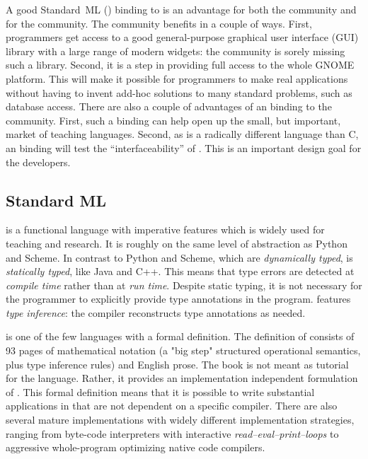 \documentclass[finalversion]{usetex-v1}
\begin{document}
%
A good Standard~ML (\sml) binding to \gtk is an advantage for
both the \sml community and for the \gtk community.  The \sml
community benefits in a couple of ways. First, \sml programmers get
access to a good general-purpose graphical user interface (GUI)
library with a large range of modern widgets: the \sml community
is sorely missing such a library.  Second, it is a step in providing full access
to the whole GNOME platform. This will make it possible for \sml
programmers to make real applications without having to invent add-hoc
solutions to many standard problems, such as database access.
There are also a couple of advantages of an \sml binding
to the \gtk community. First, such a binding can help open up the small,
but important, market of teaching languages.  Second, as \sml is a
radically different language than C, an \sml binding will test the
``interfaceability'' of \gtk. This is an important design goal for the
\gtk developers.



\subsection{Standard ML}


\sml is a functional language with imperative features which is
widely used for teaching and research.  It is roughly on the same
level of abstraction as Python and Scheme. In contrast to Python and
Scheme, which are \emph{dynamically typed}, \sml is \emph{statically
  typed}, like Java and C++. This means that type errors are detected
at \emph{compile time} rather than at \emph{run time}.  Despite 
static typing, it is not necessary for the \sml programmer to
explicitly provide type annotations in the program. \sml features
\emph{type inference}: the compiler reconstructs type
annotations as needed.

\sml is one of the few languages with a formal definition.
The definition of \sml \cite{Milner:1997:Definition}
consists of 93
pages of mathematical notation (a "big step" structured operational
semantics, plus type inference rules) and English prose.  The book is
not meant as tutorial for the language. Rather, it provides an
implementation independent formulation of \sml.  This formal
definition means that it is possible to write substantial applications
in \sml that are not dependent on a specific compiler.  There are also
several mature \sml implementations with widely different
implementation strategies, ranging from byte-code interpreters with
interactive \emph{read--eval--print--loops} to aggressive
whole-program optimizing native code compilers.
\end{document}
